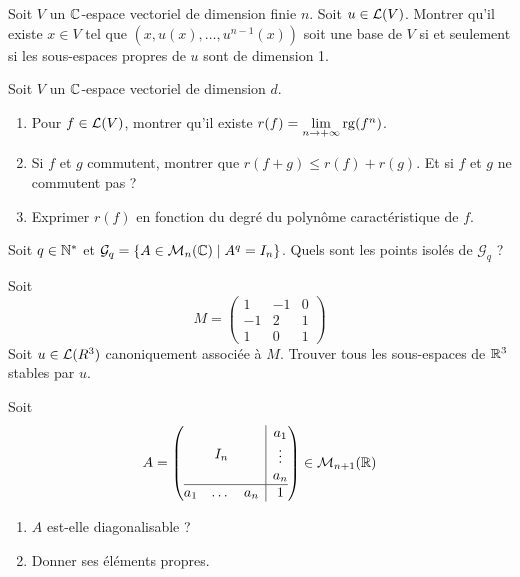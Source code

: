 \begin{exercise}
	Soit $V$ un $\mathbb{C}$-espace vectoriel de dimension finie $n$. Soit $u\in\mathcal{L}(V)$. Montrer qu'il existe $x\in V$ tel que $(x,u(x),\dots,u^{n-1}(x))$ soit une base de $V$ si et seulement si les sous-espaces propres de $u$ sont de dimension 1.
\end{exercise}

\begin{exercise}
	Soit $V$ un $\mathbb{C}$-espace vectoriel de dimension $d$.
	\begin{enumerate}
		\item Pour $f\in\mathcal{L}(V)$, montrer qu'il existe $r(f)=\lim\limits_{n\to+\infty}\operatorname{rg}(f^{n})$.
		\item Si $f$ et $g$ commutent, montrer que $r(f+g)\leqslant r(f)+r(g)$. Et si $f$ et $g$ ne commutent pas ?
		\item Exprimer $r(f)$ en fonction du degré du polynôme caractéristique de $f$.
	\end{enumerate}
\end{exercise}

\begin{exercise}
	Soit $q\in\mathbb{N}^{*}$ et $\mathcal{G}_{q}=\{A\in\mathcal{M}_{n}(\mathbb{C})\mid A^{q}=I_{n}\}$. Quels sont les points isolés de $\mathcal{G}_{q}$ ?
\end{exercise}

\begin{exercise}
	Soit 
	$$
	M=
	\begin{pmatrix}
		1 & -1 & 0\\
		-1 & 2 & 1\\
		1& 0 & 1
	\end{pmatrix}
	$$
	Soit $u\in\mathcal{L}(R^{3})$ canoniquement associée à $M$. Trouver tous les sous-espaces de $\mathbb{R}^{3}$ stables par $u$.
\end{exercise}

\begin{exercise}
	Soit 
	$$
	A=
	\left(
		\begin{array}{@{}c|c@{}}
		I_{n} &
		\begin{matrix}
			a_{1}\\
			\vdots\\
			a_{n}
			\end{matrix}
			\\
		\hline
		\begin{matrix}
			a_{1} &
			\dots
			& a_{n}
			\end{matrix}
			& 1
		\end{array}
		\right)\in\M_{n+1}(\R)
	$$
	\begin{enumerate}
		\item $A$ est-elle diagonalisable ?
		\item Donner ses éléments propres.
	\end{enumerate}
\end{exercise}

